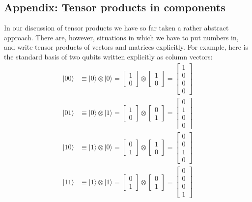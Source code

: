 \documentclass[fleqn]{article}
\begin{document}
\hypertarget{appendix-tensor-products-in-components}{%
\subsection{Appendix: Tensor products in components}\label{appendix-tensor-products-in-components}}

In our discussion of tensor products we have so far taken a rather abstract approach.
There are, however, situations in which we have to put numbers in, and write tensor products of vectors and matrices explicitly.
For example, here is the standard basis of two qubits written explicitly as column vectors:
\[
  \begin{aligned}
    |00\rangle &\equiv |0\rangle\otimes|0\rangle
    = \begin{bmatrix}1\\0\end{bmatrix} \otimes \begin{bmatrix}1\\0\end{bmatrix}
    = \begin{bmatrix}1\\0\\0\\0\end{bmatrix}
  \\[1em]
    |01\rangle &\equiv |0\rangle\otimes|1\rangle
    = \begin{bmatrix}1\\0\end{bmatrix} \otimes \begin{bmatrix}0\\1\end{bmatrix}
    = \begin{bmatrix}0\\1\\0\\0\end{bmatrix}
  \\[1em]
    |10\rangle &\equiv |1\rangle\otimes|0\rangle
    = \begin{bmatrix}0\\1\end{bmatrix} \otimes \begin{bmatrix}1\\0\end{bmatrix}
    = \begin{bmatrix}0\\0\\1\\0\end{bmatrix}
  \\[1em]
    |11\rangle &\equiv |1\rangle\otimes|1\rangle
    = \begin{bmatrix}0\\1\end{bmatrix} \otimes \begin{bmatrix}0\\1\end{bmatrix}
    = \begin{bmatrix}0\\0\\0\\1\end{bmatrix}
  \end{aligned}
\]
\end{document}
